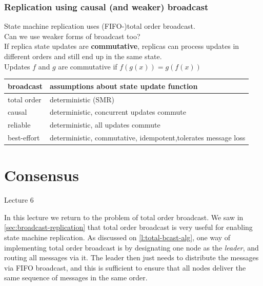 \begin{frame}
    \label{s:causal-replication}
    \frametitle{Replication using causal (and weaker) broadcast}
    State machine replication uses (FIFO-)total order broadcast.\\
    Can we use weaker forms of broadcast too?\\[1em]\pause
    If replica state updates are \textbf{commutative}, replicas can process updates in different orders and still end up in the same state.\\[1em]
    Updates $f$ and $g$ are commutative if $f(g(x)) = g(f(x))$\\\pause
    \renewcommand{\arraystretch}{1.3}
    \begin{tabular}{l|p{8cm}}
        \hline
        \textbf{broadcast} & \textbf{assumptions about state update function} \\\hline
        total order & deterministic (SMR) \pause\\
        causal & deterministic, concurrent updates commute \pause\\
        reliable & deterministic, all updates commute \pause\\
        best-effort & deterministic, commutative, idempotent,\newline tolerates message loss \\\hline
    \end{tabular}
\end{frame}
\label{l:causal-replication}

\section{Consensus}\label{sec:consensus}

\begin{frame}
    \begin{center}
        Lecture 6\\[2em]
        \Large{\color{darkblue}{Consensus}}
    \end{center}
\end{frame}

In this lecture we return to the problem of total order broadcast.
We saw in \autoref{sec:broadcast-replication} that total order broadcast is very useful for enabling state machine replication.
As discussed on \autoref{l:total-bcast-alg}, one way of implementing total order broadcast is by designating one node as the \emph{leader}, and routing all messages via it.
The leader then just needs to distribute the messages via FIFO broadcast, and this is sufficient to ensure that all nodes deliver the same sequence of messages in the same order.


